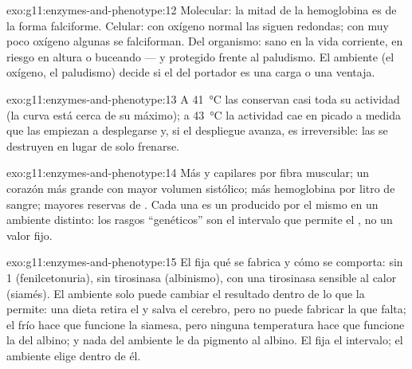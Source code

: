 \begin{solution}{exo:g11:enzymes-and-phenotype:12}
Molecular: la mitad de la hemoglobina es de la forma falciforme.
Celular: con oxígeno normal las  siguen redondas; con muy poco
oxígeno algunas se falciforman. Del organismo: sano en la vida
corriente, en riesgo en altura o buceando --- y protegido frente al
paludismo. El ambiente (el oxígeno, el paludismo) decide si el 
del portador es una carga o una ventaja.
\end{solution}

\begin{solution}{exo:g11:enzymes-and-phenotype:13}
A \qty{41}{\celsius} las  conservan casi toda su actividad (la
curva está cerca de su máximo); a \qty{43}{\celsius} la actividad cae
en picado a medida que las  empiezan a desplegarse y, si el
despliegue avanza, es irreversible: las  se destruyen en lugar
de solo frenarse.
\end{solution}

\begin{solution}{exo:g11:enzymes-and-phenotype:14}
Más  y capilares por fibra muscular; un corazón más grande
con mayor volumen sistólico; más hemoglobina por litro de sangre;
mayores reservas de . Cada una es un  producido por el
mismo  en un ambiente distinto: los rasgos ``genéticos'' son el
intervalo que permite el , no un valor fijo.
\end{solution}

\begin{solution}{exo:g11:enzymes-and-phenotype:15}
El  fija qué  se fabrica y cómo se comporta: sin  1
(fenilcetonuria), sin tirosinasa (albinismo), con una tirosinasa
sensible al calor (siamés). El ambiente solo puede cambiar el resultado
dentro de lo que la  permite: una dieta retira el  y
salva el cerebro, pero no puede fabricar la  que falta; el frío
hace que funcione la  siamesa, pero ninguna temperatura hace que
funcione la del albino; y nada del ambiente le da pigmento al albino.
El  fija el intervalo; el ambiente elige dentro de él.
\end{solution}

